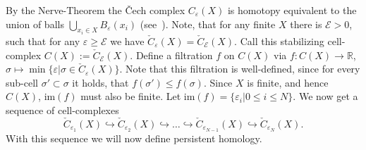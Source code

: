\documentclass[11pt, a4paper, UKenglish]{article}
\newcommand{\bR}{\mathbb{R}}
\newcommand{\im}{\textrm{im}}
\begin{document}
	By the Nerve-Theorem the Čech complex $C_\varepsilon(X)$ is homotopy equivalent to the union of balls $\bigcup_{x_i\in X} B_\varepsilon(x_i)$ (see\ \cite{eat}).
    Note, that for any finite $X$ there is $\mathcal{E}>0$, such that for any $\varepsilon\geq\mathcal{E}$ we have $\check C_\varepsilon(X) = \check C_\mathcal{E}(X)$.
    Call this stabilizing cell-complex $C(X):=\check C_\mathcal{E}(X)$.
    Define a filtration $f$ on $C(X)$ via $f:C(X)\rightarrow\bR$, $\sigma\mapsto\min\{\varepsilon|\sigma\in \check C_\varepsilon(X)\}$.
    Note that this filtration is well-defined, since for every sub-cell $\sigma'\subset\sigma$ it holds, that $f(\sigma')\leq f(\sigma)$.
    Since $X$ is finite, and hence $C(X)$, $\im(f)$ must also be finite.
    Let $\im(f)=\{\varepsilon_i|0\leq i\leq N\}$.
    We now get a sequence of cell-complexes \[\check C_{\varepsilon_1}(X)\hookrightarrow \check C_{\varepsilon_2}(X)\hookrightarrow \ldots \hookrightarrow \check C_{\varepsilon_{N-1}}(X)\hookrightarrow \check C_{\varepsilon_N}(X).\]
    With this sequence we will now define persistent homology.
\end{document}
